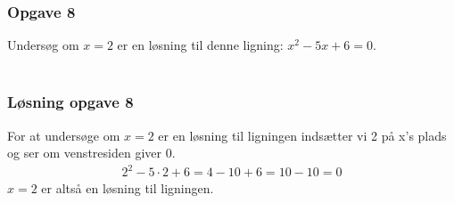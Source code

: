 \subsubsection{Opgave 8}

Undersøg om $x = 2$ er en løsning til denne ligning: $x^2 -5x + 6 = 0$.\\\\

\subsubsection*{Løsning opgave 8}

For at undersøge om $x = 2$ er en løsning til ligningen indsætter vi 2 på x's plads og ser om venstresiden giver 0.
\begin{align*}
    2^2 -5\cdot 2 + 6 = 4 - 10 + 6 = 10 - 10 = 0
\end{align*}
$x = 2$ er altså en løsning til ligningen. 